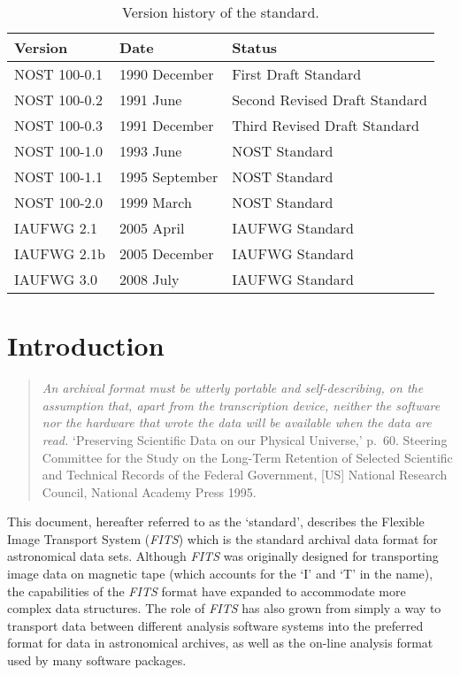 \documentclass[onecolumn]{aa}
\begin{document}
\begin{table*}
\centering
\caption{Version history of the standard.}
\label{t:docs}
\begin{tabular}{lll} 
\hline \hline
Version & Date & Status \\
\hline
NOST 100-0.1   & 1990 December & First Draft Standard  \\ 
NOST 100-0.2   & 1991 June    & Second Revised Draft Standard  \\ 
NOST 100-0.3   & 1991 December & Third Revised Draft Standard  \\
NOST 100-1.0   & 1993 June & NOST Standard  \\
NOST 100-1.1   & 1995 September & NOST Standard  \\ 
NOST 100-2.0   & 1999 March & NOST Standard  \\ 
IAUFWG 2.1     & 2005 April & IAUFWG Standard  \\ 
IAUFWG 2.1b    & 2005 December & IAUFWG Standard  \\ 
IAUFWG 3.0     & 2008 July  & IAUFWG Standard  \\ 
\hline
\end{tabular}
\end{table*}

\section{Introduction}


\begin{quote}
{\em An archival format must be utterly portable and
self-describing, on the assumption that, apart from the transcription
device, neither the software nor the hardware that wrote the data will
be available when the data are read.} 
{`Preserving Scientific Data on
our Physical Universe,' p.\ 60.} {Steering Committee for the Study on the
Long-Term Retention of Selected Scientific and Technical Records of the
Federal Government, [US] National Research Council, National Academy
Press 1995.}
\end{quote}


   This document, hereafter referred to as the `standard',  describes the
   Flexible Image Transport System ({\em FITS\/}) which is the standard
   archival data format for astronomical data sets. Although {\em FITS\/}
   was originally designed for transporting image data on magnetic tape
   (which accounts for the `I' and `T' in the name), the capabilities of
   the {\em FITS\/} format have expanded to  accommodate more complex data
   structures.   The role of {\em FITS\/} has also grown from simply a way to
   transport data between different  analysis software systems into the
   preferred format for data in astronomical archives, as well as the
   on-line analysis format used by many software packages.
\end{document}
